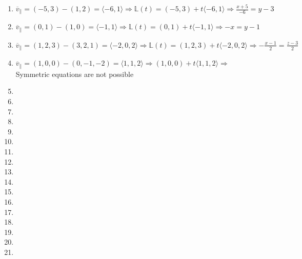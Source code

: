 \begin{enumerate}

  \item $\overline{v}_{\parallel} = ( -5, 3 ) - ( 1, 2 ) = \langle -6, 1 \rangle\Rightarrow \mathbb{L}(t) = (-5, 3) + t\langle -6, 1 \rangle \Rightarrow \frac{x + 5}{-6} = y - 3$

  \item $\overline{v}_{\parallel} = ( 0, 1 ) - ( 1, 0 ) = \langle -1, 1 \rangle \Rightarrow \mathbb{L}(t) = (0, 1) + t\langle -1, 1 \rangle\Rightarrow -x = y - 1$

  \item $\overline{v}_{\parallel} = (1, 2, 3) - (3, 2, 1) = \langle -2, 0, 2 \rangle \Rightarrow \mathbb{L}(t) = (1, 2, 3) + t\langle -2, 0, 2\rangle\Rightarrow -\frac{x - 1}{2} = \frac{z - 3}{2}$

  \item $\overline{v}_{\parallel} = (1, 0, 0) - (0, -1, -2) = \langle 1, 1, 2 \rangle \Rightarrow (1, 0, 0) + t\langle 1, 1, 2\rangle \Rightarrow$ Symmetric equations are not possible

    \setcounter{enumi}{8}

  \item

  \item

  \item

  \item

  \item

  \item

  \item

  \item

  \item

    \setcounter{enumi}{18}

  \item

    \setcounter{enumi}{20}

  \item

  \item

  \item

    \setcounter{enumi}{26}

  \item

  \item

  \item

  \item

\end{enumerate}



